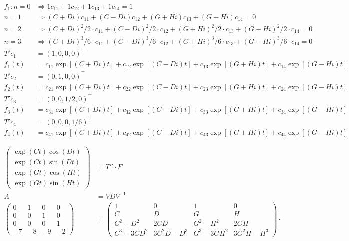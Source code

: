 \documentclass[12pt,a4paper]{article}
\begin{document}
\begin{align}
f_1: n = 0 &\Rightarrow 1 c_{11} + 1 c_{12} + 1 c_{13} + 1 c_{14} = 1 \\
n = 1 &\Rightarrow (C + Di) c_{11} + (C - Di) c_{12} + (G + Hi) c_{13} + (G - Hi) c_{14} = 0  \\
n = 2 &\Rightarrow (C + Di)^2/2\cdot c_{11} + (C - Di)^2/2\cdot c_{12} + (G + Hi)^2/2\cdot c_{13} + (G - Hi)^2/2\cdot c_{14} = 0 \\
n = 3 &\Rightarrow (C + Di)^3/6\cdot c_{11} + (C - Di)^3/6\cdot c_{12} + (G + Hi)^3/6\cdot c_{13} + (G - Hi)^3/6\cdot c_{14} = 0 \\
T' c_1 &= (1,0,0,0)^\top \\
f_1(t) &= c_{11} \exp[(C + Di)t] + c_{12} \exp[(C - Di)t] + c_{13} \exp[(G + Hi)t] + c_{14} \exp[(G - Hi)t] \\
T' c_2 &= (0,1,0,0)^\top \\
f_2(t) &= c_{21} \exp[(C + Di)t] + c_{22} \exp[(C - Di)t] + c_{23} \exp[(G + Hi)t] + c_{24} \exp[(G - Hi)t] \\
T' c_3 &= (0,0,1/2,0)^\top \\
f_3(t) &= c_{31} \exp[(C + Di)t] + c_{32} \exp[(C - Di)t] + c_{33} \exp[(G + Hi)t] + c_{34} \exp[(G - Hi)t] \\
T' c_4 &= (0,0,0,1/6)^\top \\
f_4(t) &= c_{41} \exp[(C + Di)t] + c_{42} \exp[(C - Di)t] + c_{43} \exp[(G + Hi)t] + c_{44} \exp[(G - Hi)t]
\end{align}

\begin{align}
\begin{pmatrix} \exp (Ct) \cos (Dt) \\ \exp (Ct) \sin (Dt) \\ \exp (Gt) \cos (Ht)  \\ \exp (Gt) \sin (Ht) \end{pmatrix} &= T'' \cdot F  \\
A &= VDV^{-1} \\
\left( \begin{matrix} 0 & 1 & 0 & 0 \\ 0 & 0 & 1 & 0 \\ 0 & 0 & 0 & 1 \\ -7 & -8 & -9 & -2 \end{matrix} \right)
&=
\left( \begin{matrix}  1 & 0 & 1 & 0 \\ C & D & G & H \\ C^2-D^2 & 2CD & G^2-H^2 & 2GH \\ C^3-3CD^2 & 3C^2D - D^3 & G^3-3GH^2 & 3G^2H - H^3  \end{matrix} \right) \cdot \nonumber
\end{align}
\end{document}
